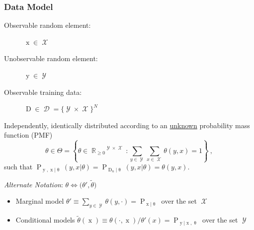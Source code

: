 \documentclass[aspectratio=169]{beamer}
\DeclareMathOperator{\xrm}{\mathrm{x}}
\DeclareMathOperator{\yrm}{\mathrm{y}}
\DeclareMathOperator{\Drm}{\mathrm{D}}
\DeclareMathOperator{\Prm}{\mathrm{P}}
\DeclareMathOperator{\Xcal}{\mathcal{X}}
\DeclareMathOperator{\Ycal}{\mathcal{Y}}
\DeclareMathOperator{\Dcal}{\mathcal{D}}
\DeclareMathOperator{\Rbb}{\mathbb{R}}
\begin{document}
\begin{frame}
\frametitle{Data Model}

\begin{description}
\item[Observable random element:] $\xrm \in \Xcal$
\item[Unobservable random element:] $\yrm \in \Ycal$
\item[Observable training data:] $\Drm \in \Dcal = \{\Ycal \times \Xcal\}^N$
\end{description}

\vspace{0.5em}

Independently, identically distributed according to an \underline{unknown} probability mass function (PMF) 
\begin{equation*}
\theta \in \Theta = \left\{ \theta \in {\Rbb_{\geq 0}}^{\Ycal \times \Xcal}: \sum_{y \in \Ycal} \sum_{x \in \Xcal} \theta(y,x) = 1 \right\} \ ,
\end{equation*}
such that $\Prm_{\yrm,\xrm | \uptheta}(y,x | \theta) = \Prm_{\Drm_n | \uptheta}(y,x | \theta) = \theta(y,x)$.

\hrulefill

\vspace{0.5em}
\textit{Alternate Notation}: $\theta \Leftrightarrow \big( \theta',\tilde{\theta} \big)$
\begin{itemize}
\item Marginal model $\theta' \equiv \sum_{y \in \Ycal} \theta(y,\cdot) = \Prm_{\xrm | \uptheta}$ over the set $\Xcal$ 
\item Conditional models $\tilde{\theta}(\xrm) \equiv \theta(\cdot,\xrm) / \theta'(x) = \Prm_{\yrm | \xrm,\uptheta}$ over the set $\Ycal$
\end{itemize}

\end{frame}
\end{document}
